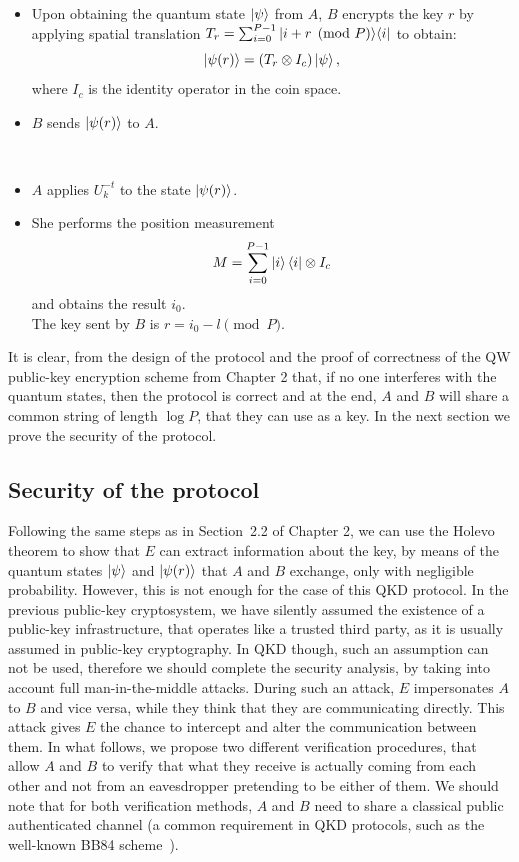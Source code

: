 \begin{protocol}
\begin{description}
\begin{itemize}
	\item Upon obtaining the quantum state $\Ket{\psi}$	from $A$, $B$ encrypts the key $r$ by applying spatial translation $T_r=\sum_{i=0}^{P-1}| i + r \pmod{P} \rangle \langle i |$ to obtain: 
		\[\Ket{\psi(r)} = (T_r\otimes I_c) \Ket{\psi},\] 
		where $I_c$ is the identity operator in the coin space. 
	\item $B$ sends $\Ket{\psi(r)}$ to $A$.
	\end{itemize}
\vspace{3mm}	
	\item[\hspace{6mm}{\bf Key decryption}]\
	\begin{itemize}
	\item $A$ applies $U_k^{-t}$ to the state $\Ket{\psi(r)}$.

	\item She performs the position measurement 
	$$
	M = \sum_{i=0}^{P-1}\Ket{i} \Bra{i}\otimes I_c
	$$ 
	and obtains the result $i_0$. 
	\\The key sent by $B$ is $r= i_0 - l \!\!\pmod {P}$.
\end{itemize}
\end{description}
\end{protocol}

It is clear, from the design of the protocol and the proof of correctness of the QW public-key encryption scheme from Chapter 2 that, if no one interferes with the quantum states, then the protocol is correct and at the end, $A$ and $B$ will share a common string of length $\log P$, that they can use as a key. In the next section we prove the security of the protocol.  


\subsection{Security of the protocol}
\label{sec:sec2way}
Following the same steps as in Section~2.2 of Chapter 2, we can use the Holevo theorem to show that $E$ can extract information about the key, by means of the quantum states $| \psi \rangle$ and $| \psi(r) \rangle$ that $A$ and $B$ exchange, only with negligible probability. However, this is not enough for the case of this  QKD protocol. In the previous public-key cryptosystem, we have silently assumed the existence of a public-key infrastructure, that operates like a trusted third party, as it is usually assumed in public-key cryptography. In QKD though, such an assumption can not be used, therefore we should complete the security analysis, by taking into account full man-in-the-middle attacks. During such an attack, $E$ impersonates $A$ to $B$ and vice versa, while they think that they are communicating directly. This attack gives $E$ the chance to intercept and alter the communication between them. In what follows, we propose two different verification procedures, that allow $A$ and $B$ to verify that what they receive is actually coming from each other and not from an eavesdropper pretending to be either of them. We should note that for both verification methods, $A$ and $B$ need to share a classical public authenticated channel (a common requirement in QKD protocols, such as the well-known BB84 scheme~\cite{ben:bra:84}).


